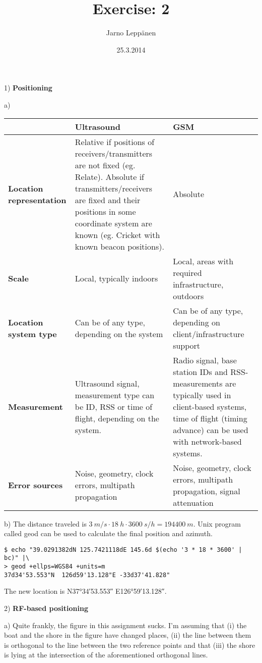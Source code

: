 \documentclass[a4paper,parskip=full]{scrartcl}
\author{Jarno Leppänen}
\title{Exercise: 2}
\date{25.3.2014}
\begin{document}
\maketitle

1) \textbf{Positioning}

a)

\begin{tabularx}{\textwidth}{ | >{\raggedright\arraybackslash}p{14ex} | >{\raggedright\arraybackslash}X | >{\raggedright\arraybackslash}X | }
  \hline
  & \textbf{Ultrasound} & \textbf{GSM} \\ \hline
  \textbf{Location representation} &
    Relative if positions of receivers/transmitters are not fixed (eg.
    Relate). Absolute if transmitters/receivers are fixed and their positions in
    some coordinate system are known (eg. Cricket with known beacon positions).
    &
    Absolute \\ \hline
  \textbf{Scale} & Local, typically indoors & Local, areas with required
    infrastructure, outdoors \\ \hline
  \textbf{Location system type} & Can be of any type, depending on the system
    & Can be of any type, depending on client/infrastructure support \\ \hline
  \textbf{Measurement} & Ultrasound signal, measurement type can be
    ID, RSS or time of flight, depending on the system. & Radio signal,
      base station IDs and RSS-measurements are typically used in
      client-based systems, time of flight (timing advance) can be used with
      network-based systems. \\ \hline
  \textbf{Error sources} & Noise, geometry, clock errors, multipath propagation
    & Noise, geometry, clock errors, multipath propagation, signal
      attenuation \\ \hline
\end{tabularx}

b) The distance traveled is $\SI{3}{m/s} \cdot \SI{18}{h} \cdot \SI{3600}{s/h}
= \SI{194400}{m}$. Unix program called geod can be used to calculate the
final position and azimuth.
\begin{verbatim}
$ echo "39.0291382dN 125.7421118dE 145.6d $(echo '3 * 18 * 3600' | bc)" |\
> geod +ellps=WGS84 +units=m
37d34'53.553"N  126d59'13.128"E -33d37'41.828"
\end{verbatim}
The new location is N\ang{37;34;53.553} E\ang{126;59;13.128}.

2) \textbf{RF-based positioning}

a) Quite frankly, the figure in this assignment sucks. I'm assuming that (i) the
boat and the shore in the figure have changed places, (ii) the line between them
is orthogonal to the line between the two reference points and that (iii)
the shore is lying at the intersection of the aforementioned orthogonal lines.
\end{document}
